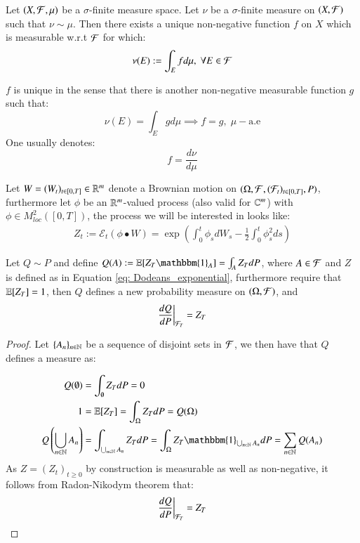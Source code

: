 \begin{theorem}
Let $(X, \mathcal{F}, \mu)$ be a $\sigma$-finite measure space. Let $\nu$ be a $\sigma$-finite measure on $(X, \mathcal{F})$ such that $\nu \sim \mu$. Then there exists a unique non-negative function $f$ on $X$ which is measurable w.r.t $\mathcal{F}$ for which: 
\begin{align*}
\nu(E) := \int_{E}fd\mu, \; \forall  E\in \mathcal{F}    
\end{align*}

$f$ is unique in the sense that there is another non-negative measurable function $g$ such that:
\[
\nu(E) = \int_{E}gd\mu \implies f=g,\; \mu-\text{a.e}
\]
One usually denotes: 
\[
f = \frac{d\nu}{d\mu}
\]
\end{theorem} 

Let $W = (W_{t})_{t\in [0,T]} \in \mathbb{R}^{m}$ denote a Brownian motion on $(\Omega, \mathcal{F}, (\mathcal{F}_{t})_{t\in [0,T]}, P)$, furthermore let $\phi$ be an $\mathbb{R}^{m}$-valued process (also valid for $\mathbb{C}^{m}$) with \\
$\phi \in M^{2}_{loc}([0,T])$, the process we will be interested in looks like: 
\begin{align}
\label{eq: Dodeans_exponential}
Z_{t} := \mathcal{E}_{t}\left(
\phi \bullet W
\right) =
\exp\left(
\int_{0}^{t}\phi_{s}dW_{s} - \frac{1}{2}\int_{0}^{t}\phi_{s}^{2}ds
\right)
\end{align}

\begin{proposition}
Let $Q\sim P$ and define 
$Q(A) := \E[Z_{T}\mathbbm{1}_{A}] = \int_{A}Z_{T}dP$, where $A \in \mathcal{F}$ and $Z$ is defined as in Equation \ref{eq: Dodeans_exponential}, furthermore require that $\mathbb{E}[Z_{T}] = 1$, then $Q$ defines a new probability measure on $(\Omega, \mathcal{F})$, and $$
\frac{dQ}{dP}\bigg{|}_{\mathcal{F}_{T}} = Z_{T}
$$
\end{proposition}

\begin{proof}
Let $\{A_{n}\}_{n\in \mathbb{N}}$ be a sequence of disjoint sets in $\mathcal{F}$, we then have that $Q$ defines a measure as: 

\begin{align*}
Q(\emptyset) &= \int_{\emptyset}Z_{T}dP = 0 \\
1 &= \E[Z_{T}] = \int_{\Omega}Z_{T}dP = Q(\Omega)\\ 
Q\left(
\bigcup_{n\in \N}A_{n}
\right)
&= 
\int_{\bigcup_{n\in \N}A_{n}}Z_{T}dP
= \int_{\Omega}Z_{T}\mathbbm{1}_{\bigcup_{n\in \N}A_{n}}dP
= \sum_{n\in \N}Q(A_{n})
\end{align*}
As $Z = (Z_{t})_{t\geq 0}$ by construction is measurable as well as non-negative, it follows from Radon-Nikodym theorem that: 
\[
\frac{dQ}{dP}\bigg{|}_{\mathcal{F}_{T}} = Z_{T}
\]
\end{proof}

